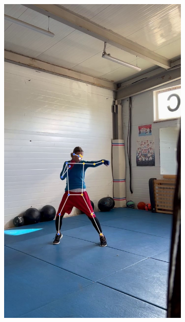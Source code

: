 \begin{figure}[h]
\begin{subfigure}[b]{0.24\textwidth}
	\includegraphics[width=\textwidth]{./images/experiment/data_info/box_examples/ex_1}
\end{subfigure}
\begin{subfigure}[b]{0.24\textwidth}
	\centering

\end{subfigure}
\end{figure}
